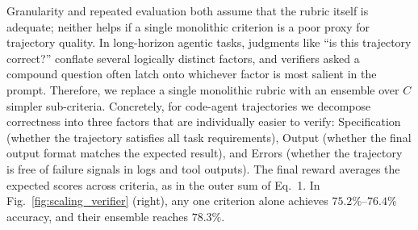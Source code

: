 Granularity and repeated evaluation both assume that the rubric itself is adequate; neither helps if a single monolithic criterion is a poor proxy for trajectory quality. In long-horizon agentic tasks, judgments like ``is this trajectory correct?'' conflate several logically distinct factors, and verifiers asked a compound question often latch onto whichever factor is most salient in the prompt. Therefore, we replace a single monolithic rubric with an ensemble over $C$ simpler sub-criteria. Concretely, for code-agent trajectories we decompose correctness into three factors that are individually easier to verify: Specification (whether the trajectory satisfies all task requirements), Output (whether the final output format matches the expected result), and Errors (whether the trajectory is free of failure signals in logs and tool outputs). The final reward averages the expected scores across criteria, as in the outer sum of Eq.~1. In Fig.~\ref{fig:scaling_verifier} (right), any one criterion alone achieves $75.2\%$--$76.4\%$ accuracy, and their ensemble reaches $78.3\%$.